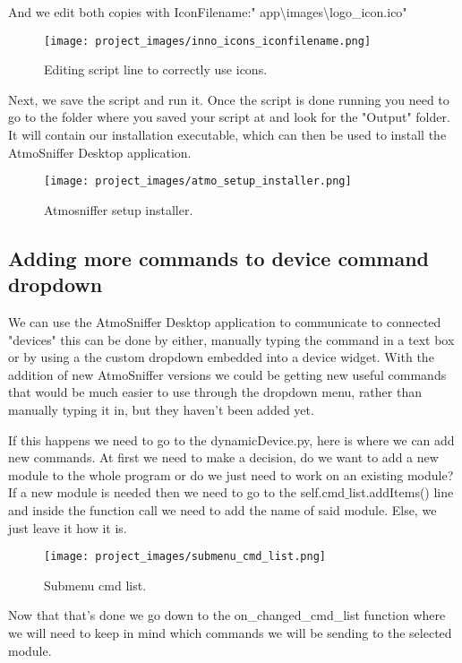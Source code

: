 	And we edit both copies with IconFilename:" \textbraceleft app\textbraceright 	\textbackslash images\textbackslash logo\_icon.ico" 

\begin{figure}[H]
\centering
\texttt{[image: project\_images/inno\_icons\_iconfilename.png]}
 \caption{Editing script line to correctly use icons.}
 \label{fig:inno icons iconfilename}
\end{figure}

	Next, we save the script and run it. Once the script is done running you need to go to the folder where you saved your script at and look for the "Output" folder. It will contain our installation executable, which can then be used to install the AtmoSniffer Desktop application.

\begin{figure}[H]
\centering
\texttt{[image: project\_images/atmo\_setup\_installer.png]}
 \caption{Atmosniffer setup installer.}
 \label{fig:atmo setup installer}
\end{figure}

\subsection{Adding more commands to device command dropdown}
	We can use the AtmoSniffer Desktop application to communicate to connected "devices" this can be done by either, manually typing the command in a text box or by using a the custom dropdown embedded into a device widget. With the addition of new AtmoSniffer versions we could be getting new useful commands that would be much easier to use through the dropdown menu, rather than manually typing it in, but they haven't been added yet.

	If this happens we need to go to the dynamicDevice.py, here is where we can add new commands. At first we need to make a decision, do we want to add a new module to the whole program or do we just need to work on an existing module? If a new module is needed then we need to go to the self.cmd$\_$list.addItems() line and inside the function call we need to add the name of said module. Else, we just leave it how it is.

\begin{figure}[H]
\centering
\texttt{[image: project\_images/submenu\_cmd\_list.png]}
 \caption{Submenu cmd list.}
 \label{fig:submenu cmd listr}
\end{figure}

	Now that that's done we go down to the on\_changed\_cmd\_list function where we will need to keep in mind which commands we will be sending to the selected module.

